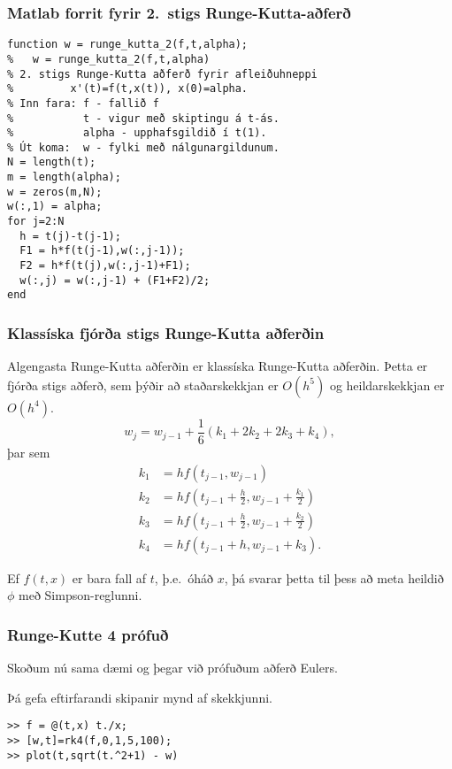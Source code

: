 \documentclass[icelandic,a4paper,12pt]{article}
\begin{document}
\subsubsection{Matlab forrit fyrir 2.~stigs Runge-Kutta-aðferð} 
\begin{verbatim}
function w = runge_kutta_2(f,t,alpha);
%   w = runge_kutta_2(f,t,alpha)
% 2. stigs Runge-Kutta aðferð fyrir afleiðuhneppi 
%         x'(t)=f(t,x(t)), x(0)=alpha. 
% Inn fara: f - fallið f 
%           t - vigur með skiptingu á t-ás. 
%           alpha - upphafsgildið í t(1). 
% Út koma:  w - fylki með nálgunargildunum. 
N = length(t);   
m = length(alpha); 
w = zeros(m,N);  
w(:,1) = alpha; 
for j=2:N 
  h = t(j)-t(j-1);
  F1 = h*f(t(j-1),w(:,j-1));
  F2 = h*f(t(j),w(:,j-1)+F1); 
  w(:,j) = w(:,j-1) + (F1+F2)/2; 
end 
\end{verbatim}


\subsubsection{Klassíska fjórða stigs Runge-Kutta aðferðin}
 Algengasta Runge-Kutta aðferðin er klassíska Runge-Kutta aðferðin. Þetta
 er fjórða stigs aðferð, sem þýðir að staðarskekkjan er $O(h^5)$ og heildarskekkjan er $O(h^4)$.
\pause
$$
 w_{j} = w_{j-1} + \frac 16(k_1 + 2k_2 + 2k_3 + k_4),
 $$
 \pause
 þar sem
 \begin{align*}
  k_1 &= hf(t_{j-1},w_{j-1}) \\
  k_2 &= hf\left(t_{j-1} + \frac h2,w_{j-1}+ \frac{k_1}2\right) \\
  k_3 &= hf\left(t_{j-1} + \frac h2,w_{j-1}+ \frac{k_2}2\right) \\
  k_4 &= hf(t_{j-1} + h,w_{j-1}+ k_3).
 \end{align*}
 
 \pause
 Ef $f(t,x)$ er bara fall af $t$, þ.e.~óháð $x$, þá svarar þetta til þess að meta heildið $\phi$
 með Simpson-reglunni.



\subsubsection{Runge-Kutte 4 prófuð}
Skoðum nú sama dæmi og þegar við prófuðum aðferð Eulers.

Þá gefa eftirfarandi skipanir mynd af skekkjunni.
\begin{verbatim}
>> f = @(t,x) t./x;
>> [w,t]=rk4(f,0,1,5,100);
>> plot(t,sqrt(t.^2+1) - w)
\end{verbatim}
\end{document}
